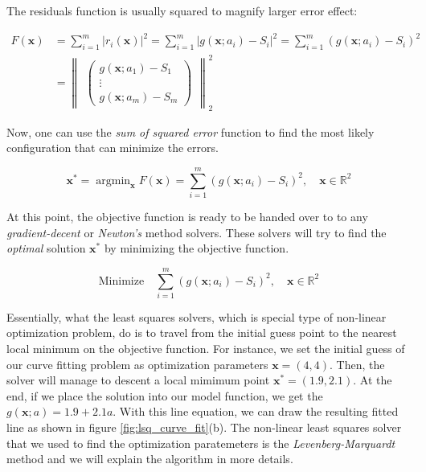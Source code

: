 \documentclass[a4paper]{report}
\numberwithin{figure}{section}
\newcommand{\argmin}{\mathop{\mathrm{argmin}}}
\newcommand{\R}{\mathbb{R}}
\begin{document}
The residuals function is usually squared to magnify larger error effect:

\begin{equation}
\begin{aligned}
  F(\mathbf{x}) & = \sum_{i=1}^{m} \vert r_i(\mathbf{x}) \vert^2 = 
  \sum_{i=1}^{m} \vert g(\mathbf{x};a_i) - S_i \vert^2 =
  \sum_{i=1}^{m} (g(\mathbf{x};a_i) - S_i)^2 \\
& = \begin{Vmatrix}
  \begin{pmatrix} g(\mathbf{x};a_1) - S_1 \\ \vdots \\ g(\mathbf{x};a_m) - S_m \end{pmatrix} 
\end{Vmatrix}_2^2
\label{eq}
\end{aligned}
\end{equation}

Now, one can use the \textit{sum of squared error} function to find the most likely
configuration that can minimize the errors. 

\begin{equation}
  \mathbf{x}^* = \argmin_{\mathbf{x}} F(\mathbf{x}) = 
  \sum_{i=1}^{m} (g(\mathbf{x};a_i) - S_i)^2, 
  \quad \mathbf{x} \in \R^2
\label{eq}
\end{equation}

At this point, the objective function is ready to be handed over to 
to any \textit{gradient-decent} or 
\textit{Newton's} method solvers.
These solvers will try to find the
\textit{optimal} solution $\mathbf{x}^*$ by minimizing the objective function.

\begin{equation}
  \text{Minimize} \quad \sum_{i=1}^{m} (g(\mathbf{x};a_i) - S_i)^2, 
\quad \mathbf{x} \in \R^2
\label{eq}
\end{equation}


Essentially, what the least squares solvers, which is special type of 
non-linear optimization problem, 
do is to travel from the initial guess point to the nearest local minimum 
on the objective function. 
For instance, we set  
the initial guess of our curve fitting problem 
as optimization parameters $\mathbf{x}=(4,4)$. 
Then, the solver will 
manage to descent a local mimimum point 
$\mathbf{\mathbf{x^*}}=(1.9,2.1)$. 
At the end, if we place the solution into our model function, we
get the $g(\mathbf{x};a)=1.9+2.1a$. With this line equation, we can draw the resulting fitted line 
as shown in figure \ref{fig:lsq_curve_fit}(b).
The non-linear least squares solver that we used to find the optimization 
paratemeters is the \textit{Levenberg-Marquardt} method and we will explain 
the algorithm in more details.
\end{document}
